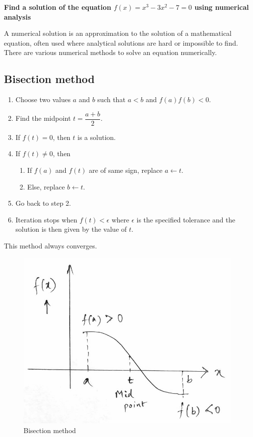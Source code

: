 \documentclass[a4paper,11pt]{book}
\begin{document}
\noindent \textbf{Find a solution of the equation $f(x) = x^3-3x^2-7 = 0$ using numerical analysis}
\vspace{5mm}

\noindent A numerical solution is an approximation to the solution of a mathematical equation, often used where analytical solutions are hard or impossible to find. There are various numerical methods to solve an equation numerically.

\subsection{Bisection method}
\begin{enumerate}
    \item Choose two values $a$ and $b$ such that $a<b$ and $f(a)f(b) < 0$.
    \item Find the midpoint $t = \dfrac{a+b}{2}$.
    \item If $f(t) = 0$, then $t$ is a solution.
    \item If $f(t) \neq 0$, then
    \begin{enumerate}
        \item If $f(a)$ and $f(t)$ are of same sign, replace $a \leftarrow t$.
        \item Else, replace $b \leftarrow t$.
    \end{enumerate}
    \item Go back to step 2.
    \item Iteration stops when $f(t) < \epsilon$ where $\epsilon$ is the specified tolerance and the solution is then given by the value of $t$.
\end{enumerate}
\noindent This method always converges.
\vspace{5mm}

\begin{figure}[ht]
	\centering
	\includegraphics[scale=0.3]{code/sort/pic/bisection.jpeg}
	\caption{Bisection method}
\end{figure}
\end{document}
